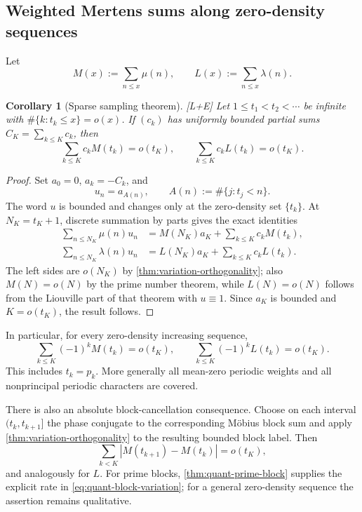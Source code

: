 \documentclass[11pt]{article}
\newtheorem{corollary}[theorem]{Corollary}
\theoremstyle{definition}
\theoremstyle{remark}
\newcommand{\status}[1]{\textnormal{\textcolor{accent}{\footnotesize[#1]}}}
\begin{document}
\subsection{Weighted Mertens sums along zero-density sequences}

Let
\[
 M(x):=\sum_{n\le x}\mu(n),\qquad
 L(x):=\sum_{n\le x}\lambda(n).
\]

\begin{corollary}[Sparse sampling theorem]\label{cor:sparse-Mertens}
\status{L+E}
Let $1\le t_1<t_2<\cdots$ be infinite with
$\#\{k:t_k\le x\}=o(x)$.  If $(c_k)$ has uniformly bounded partial sums
$C_K=\sum_{k\le K}c_k$, then
\begin{equation}\label{eq:sparse-Mertens}
 \sum_{k\le K}c_kM(t_k)=o(t_K),
 \qquad
 \sum_{k\le K}c_kL(t_k)=o(t_K).
\end{equation}
\end{corollary}

\begin{proof}
Set $a_0=0$, $a_k=-C_k$, and
\[
 u_n=a_{A(n)},\qquad A(n):=\#\{j:t_j<n\}.
\]
The word $u$ is bounded and changes only at the zero-density set $\{t_k\}$.  At
$N_K=t_K+1$, discrete summation by parts gives the exact identities
\begin{align*}
 \sum_{n\le N_K}\mu(n)u_n
 &=M(N_K)a_K+\sum_{k\le K}c_kM(t_k),\\
 \sum_{n\le N_K}\lambda(n)u_n
 &=L(N_K)a_K+\sum_{k\le K}c_kL(t_k).
\end{align*}
The left sides are $o(N_K)$ by \cref{thm:variation-orthogonality}; also
$M(N)=o(N)$ by the prime number theorem, while $L(N)=o(N)$ follows from the Liouville
part of that theorem with $u\equiv1$.  Since $a_K$ is bounded and $K=o(t_K)$, the result
follows.
\end{proof}

In particular, for every zero-density increasing sequence,
\begin{equation}\label{eq:alternating-Mertens}
 \sum_{k\le K}(-1)^kM(t_k)=o(t_K),\qquad
 \sum_{k\le K}(-1)^kL(t_k)=o(t_K).
\end{equation}
This includes $t_k=p_k$.  More generally all mean-zero periodic weights and all
nonprincipal periodic characters are covered.

There is also an absolute block-cancellation consequence.  Choose on each interval
$(t_k,t_{k+1}]$ the phase conjugate to the corresponding M\"obius block sum and apply
\cref{thm:variation-orthogonality} to the resulting bounded block label.  Then
\begin{equation}\label{eq:block-absolute-cancellation}
 \sum_{k<K}|M(t_{k+1})-M(t_k)|=o(t_K),
\end{equation}
and analogously for $L$.  For prime blocks, \cref{thm:quant-prime-block} supplies the
explicit rate in \eqref{eq:quant-block-variation}; for a general zero-density sequence
the assertion remains qualitative.
\end{document}
